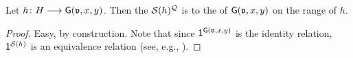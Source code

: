 
\begin{proposition}\label{proposition: QS and ORD}
    Let $h \colon \graph[2] \homo \const{\graph}(\val, x, y)$.
    Then the  $\mathcal{S}(h)^{\mathcal{Q}}$ is  to the  of $\const{\graph}(\val, x, y)$ on the range of $h$.
\end{proposition}
\begin{proof}
    Easy, by construction.
    Note that since $\id^{\const{\graph}(\val, x, y)}$ is the identity relation, $\mathsf{1}^{\mathcal{S}(h)}$ is an equivalence relation (see, e.g., ).
\end{proof}


